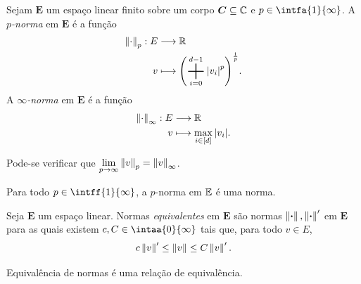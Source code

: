\begin{defi}
Sejam $\bm E$ um espaço linear finito sobre um corpo $\bm C \subseteq \mathbb{C}$ e $p \in \intfa{1}{\infty}$. A \emph{$p$-norma} em $\bm E$ é a função
	\begin{align*}
	\func{\nor{\cdot}_p}{E}{\R}{v}{\left(\sum_{i=0}^{d-1}\abs{v_i}^p\right)^{\frac{1}{p}}}.
	\end{align*}
A \emph{$\infty$-norma} em $\bm E$ é a função
	\begin{align*}
	{\left\Vert{\cdot}\right\Vert_\infty}: {E} &\longrightarrow {\mathbb{R}} \\{v} &\longmapsto {\max_{i \in [d]} \left\vert{v_i}\right\vert}.
	\end{align*}
\end{defi}

Pode-se verificar que $\displaystyle\lim_{p \rightarrow \infty} \left\Vert{v}\right\Vert_p = \left\Vert{v}\right\Vert_\infty$.

\begin{prop}
Para todo $p \in \intff{1}{\infty}$, a $p$-norma em $\mathbb{E}$ é uma norma.
\end{prop}

\begin{defi}
Seja $\bm E$ um espaço linear. Normas \emph{equivalentes} em $\bm E$ são normas $\left\Vert{\bm{\cdot}}\right\Vert, \left\Vert{\bm{\cdot}}\right\Vert'$ em $\bm E$ para as quais existem $c,C \in \intaa{0}{\infty}$ tais que, para todo $v \in E$,
	\begin{equation*}
	c \left\Vert{v}\right\Vert' \leq \left\Vert{v}\right\Vert \leq C \left\Vert{v}\right\Vert'.
	\end{equation*}
\end{defi}


\begin{prop}
Equivalência de normas é uma relação de equivalência.
\end{prop}

